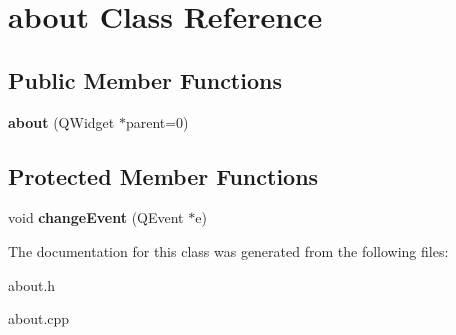 \hypertarget{classabout}{
\section{about Class Reference}
\label{classabout}
}
\subsection*{Public Member Functions}
\begin{DoxyCompactItemize}
\item 
\hypertarget{classabout_ab16a8ec628d97aee17f0332e09964f52}{
{\bfseries about} (QWidget $\ast$parent=0)}
\label{classabout_ab16a8ec628d97aee17f0332e09964f52}

\end{DoxyCompactItemize}
\subsection*{Protected Member Functions}
\begin{DoxyCompactItemize}
\item 
\hypertarget{classabout_a8c1b88bafc3aa839bfb45fc1d5c99e60}{
void {\bfseries changeEvent} (QEvent $\ast$e)}
\label{classabout_a8c1b88bafc3aa839bfb45fc1d5c99e60}

\end{DoxyCompactItemize}


The documentation for this class was generated from the following files:\begin{DoxyCompactItemize}
\item 
about.h\item 
about.cpp\end{DoxyCompactItemize}
